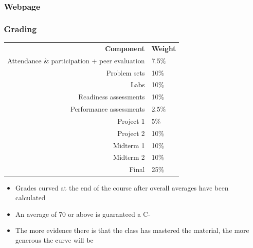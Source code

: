 \documentclass[11pt,containsverbatim,handout,xcolor=xelatex,dvipsnames,table]{beamer}
\begin{document}

\begin{frame}
\frametitle{Webpage}

\vfill

\centering
{\Large 
{}
}

\vfill

\end{frame}


\begin{frame}
\frametitle{Grading}

\begin{center}
\renewcommand\arraystretch{1.25}
{\scriptsize
\begin{tabular}{ r | l }
\textbf{Component} & \textbf{Weight} \\
Attendance \& participation + peer evaluation	& 7.5\% \\
Problem sets							& 10\%  \\ 
Labs									& 10\% \\    
Readiness assessments					& 10\%   \\  
Performance assessments 				& 2.5\%  \\  
Project 1								& 5\%   \\   
Project 2								& 10\% \\   
Midterm 1								& 10\% \\    
Midterm 2 							& 10\% \\    
Final 								& 25\%     
\end{tabular}
}
\end{center}

\begin{itemize}

\item Grades curved at the end of the course after overall averages have been calculated

\item An average of 70 or above is guaranteed a C-

\item The more evidence there is that the class has mastered the material, the more generous the curve will be

\end{itemize}

\end{frame}

\end{document}
